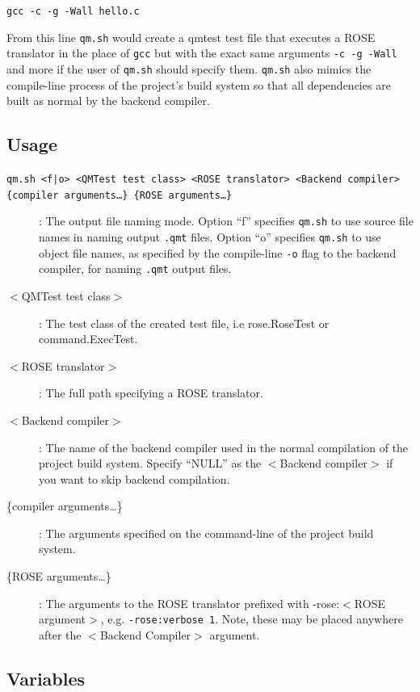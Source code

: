 \begin{center}
  {\tt gcc -c -g -Wall hello.c}
\end{center}
From this line {\tt qm.sh} would create a qmtest test file that executes
a ROSE translator in the place of {\tt gcc} but with the exact same arguments
{\tt -c -g -Wall} and more if the user of {\tt qm.sh} should specify them.
{\tt qm.sh} also mimics the compile-line process of the project's build system
so that all dependencies are built as normal by the backend compiler.

\subsection{Usage}

{\tt qm.sh <f|o> <QMTest test class> <ROSE translator> <Backend compiler> 
\{compiler arguments\ldots\} \{ROSE arguments\ldots\}}

\begin{description}
  \item[{\large {\tt <f|o>}}] : The output file naming mode. Option ``f'' specifies
	{\tt qm.sh} to use source file names in naming output {\tt .qmt} files.
	Option ``o'' specifies {\tt qm.sh} to use object file names, as
	specified by the compile-line {\tt -o} flag to the backend compiler,
	for naming {\tt .qmt} output files.
  \item[$<$QMTest test class$>$] : The test class of the created test file,
	i.e rose.RoseTest or command.ExecTest.
  \item[$<$ROSE translator$>$] : The full path specifying a ROSE translator.
  \item[$<$Backend compiler$>$] : The name of the backend compiler used in
	the normal compilation of the project build system. Specify ``NULL'' as
	the $<$Backend compiler$>$ if you want to skip backend compilation.
  \item[\{compiler arguments\ldots\}] : The arguments specified on
	the command-line of the project build system.
  \item[\{ROSE arguments\ldots\}] : The arguments to the ROSE translator
	prefixed with -rose:$<$ROSE argument$>$, e.g.
	{\tt -rose:verbose 1}. Note, these may be placed anywhere
	after the $<$Backend Compiler$>$ argument.
\end{description}

\subsection{Variables}

